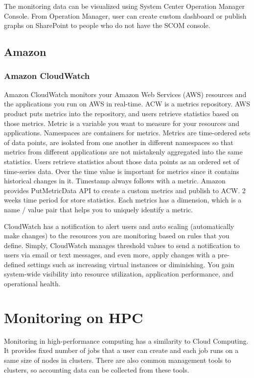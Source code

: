 \documentclass{sig-alternate-05-2015}
\begin{document}
The monitoring data can be visualized using System Center Operation Manager Console. From Operation Manager, user can create custom dashboard or publish graphs on SharePoint to people who do not have the SCOM console.

\subsection{Amazon}

\subsubsection{Amazon CloudWatch}

Amazon CloudWatch monitors your Amazon Web Services (AWS) resources and the applications you run on AWS in real-time. ACW is a metrics repository. AWS product puts metrics into the repository, and users retrieve statistics based on those metrics. Metric is a variable you want to measure for your resources and applications. Namespaces are containers for metrics. Metrics are time-ordered sets of data points, are isolated from one another in different namespaces so that metrics from different applications are not mistakenly aggregated into the same statistics. Users retrieve statistics about those data points as an ordered set of time-series data. Over the time value is important for metrics since it contains historical changes in it. Timestamp always follows with a metric. Amazon provides PutMetricData API to create a custom metrics and publish to ACW. 2 weeks time period for store statistics. Each metrics has a dimension, which is a name / value pair that helps you to uniquely identify a metric.

CloudWatch has a notification to alert users and auto scaling (automatically make changes) to the resources you are monitoring based on rules that you define. Simply, CloudWatch manages threshold values to send a notification to users via email or text messages, and even more, apply changes with a pre-defined settings such as increasing virtual instances or diminishing. You gain system-wide visibility into resource utilization, application performance, and operational health.

\section{Monitoring on HPC}

Monitoring in high-performance computing has a similarity to Cloud Computing. It provides fixed number of jobs that a user can create and each job runs on a same size of nodes in clusters. There are also common management tools to clusters, so accounting data can be collected from these tools.
\end{document}
